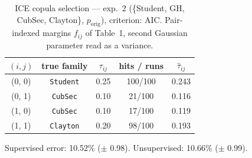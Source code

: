 \begin{table}[htbp]
  \centering
  \caption{ICE copula selection — exp.\ 2 (\{Student, GH, CubSec, Clayton\}, $p_{\text{orig}}$), criterion: AIC. Pair-indexed margins $f_{ij}$ of Table~1, second Gaussian parameter read as a variance.}
  \label{tab:exp3-exp2_orig_p__aic}
  \begin{tabular}{ccccc}
    \toprule
    $(i, j)$ & true family & $\tau_{ij}$ & hits / runs & $\hat\tau_{ij}$ \\
    \midrule
    (0, 0) & \texttt{Student} & 0.25 & 100/100 & 0.243 \\
    (0, 1) & \texttt{CubSec} & 0.10 & 21/100 & 0.116 \\
    (1, 0) & \texttt{CubSec} & 0.10 & 17/100 & 0.119 \\
    (1, 1) & \texttt{Clayton} & 0.20 & 98/100 & 0.193 \\
    \bottomrule
  \end{tabular}
  \par\smallskip Supervised error: 10.52\% ($\pm$ 0.98). Unsupervised: 10.66\% ($\pm$ 0.99).
\end{table}
